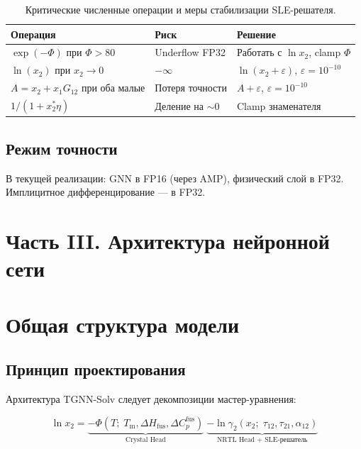 \documentclass[11pt]{article}
\begin{document}
\begin{table}[H]
\centering
\begin{tabularx}{\textwidth}{|P{3.9cm}|P{2.6cm}|Y|}
\hline
Операция & Риск & Решение \\
\hline
$\exp(-\Phi)$ при $\Phi > 80$ & Underflow FP32 & Работать с $\ln x_2$, clamp $\Phi$ \\
\hline
$\ln(x_2)$ при $x_2 \to 0$ & $-\infty$ & $\ln(x_2 + \varepsilon)$, $\varepsilon = 10^{-10}$ \\
\hline
$A = x_2 + x_1 G_{12}$ при оба малые & Потеря точности & $A + \varepsilon$, $\varepsilon = 10^{-10}$ \\
\hline
$1/(1 + x_2^{*}\eta)$ & Деление на $\sim 0$ & Clamp знаменателя \\
\hline
\end{tabularx}
\caption{Критические численные операции и меры стабилизации SLE-решателя.}
\end{table}

\subsection{Режим точности}

В текущей реализации: GNN в FP16 (через AMP), физический слой в FP32. Имплицитное дифференцирование --- в FP32.

\section*{Часть III. Архитектура нейронной сети}

\section{Общая структура модели}

\subsection{Принцип проектирования}

Архитектура TGNN-Solv следует декомпозиции мастер-уравнения:

\begin{equation*}
\ln x_2 = \underbrace{-\Phi(T;\; T_{\mathrm{m}}, \Delta H_{\mathrm{fus}}, \Delta C_p^{\mathrm{fus}})}_{\text{Crystal Head}} \;\underbrace{- \ln \gamma_2(x_2;\; \tau_{12}, \tau_{21}, \alpha_{12})}_{\text{NRTL Head + SLE-решатель}}
\end{equation*}
\end{document}
